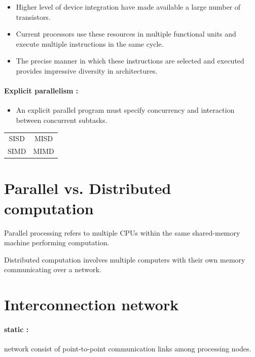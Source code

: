 \documentclass[11pt,a4paper]{report}
\begin{document}
\begin{itemize}
    \item Higher level of device integration have made available a large number of transistors.
    \item Current processors use these resources in multiple functional units and execute multiple instructions in the same cycle.
    \item The precise manner in which these instructions are selected and executed provides impressive diversity in architectures.
\end{itemize}

\paragraph*{Explicit parallelism : }

\begin{itemize}
    \item An explicit parallel program must specify concurrency and interaction between concurrent subtasks.
\end{itemize}

\begin{tabular}{cc}
    SISD & MISD \\
    SIMD & MIMD
\end{tabular}


\section{Parallel vs. Distributed computation} %
\label{sec:Parallel vs. Distributed computation}

Parallel processing refers to multiple CPUs within the same shared-memory machine performing computation.

Distributed computation involves multiple computers with their own memory communicating over a network.


\section{Interconnection network} %
\label{sec:Interconnection network}

\paragraph*{static :} network consist of point-to-point communication links among processing nodes.
\end{document}
